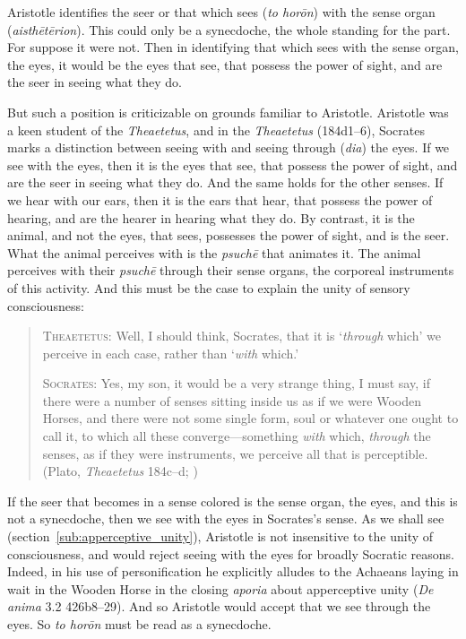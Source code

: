 Aristotle identifies the seer or that which sees (\emph{to horōn}) with the sense organ (\emph{aisthētērion}). This could only be a synecdoche, the whole standing for the part. For suppose it were not. Then in identifying that which sees with the sense organ, the eyes, it would be the eyes that see, that possess the power of sight, and are the seer in seeing what they do. 

But such a position is criticizable on grounds familiar to Aristotle. Aristotle was a keen student of the \emph{Theaetetus}, and in the \emph{Theaetetus} (184d1–6), Socrates marks a distinction between seeing with and seeing through (\emph{dia}) the eyes. If we see with the eyes, then it is the eyes that see, that possess the power of sight, and are the seer in seeing what they do. And the same holds for the other senses. If we hear with our ears, then it is the ears that hear, that possess the power of hearing, and are the hearer in hearing what they do. By contrast, it is the animal, and not the eyes, that sees, possesses the power of sight, and is the seer. What the animal perceives with is the \emph{psuchē} that animates it. The animal perceives with their \emph{psuchē} through their sense organs, the corporeal instruments of this activity. And this must be the case to explain the unity of sensory consciousness:
\begin{quotation}
	\textsc{Theaetetus}: Well, I should think, Socrates, that it is `\emph{through} which' we perceive in each case, rather than `\emph{with} which.'
	
	\textsc{Socrates}: Yes, my son, it would be a very strange thing, I must say, if there were a number of senses sitting inside us as if we were Wooden Horses, and there were not some single form, soul or whatever one ought to call it, to which all these converge—something \emph{with} which, \emph{through} the senses, as if they were instruments, we perceive all that is perceptible. (Plato, \emph{Theaetetus} 184c–d; \citealt[315]{Burnyeat:1990dp})
\end{quotation}

If the seer that becomes in a sense colored is the sense organ, the eyes, and this is not a synecdoche, then we see with the eyes in Socrates's sense. As we shall see (section~\ref{sub:apperceptive_unity}), Aristotle is not insensitive to the unity of consciousness, and would reject seeing with the eyes for broadly Socratic reasons. Indeed, in his use of personification he explicitly alludes to the Achaeans laying in wait in the Wooden Horse in the closing \emph{aporia} about apperceptive unity (\emph{De anima} 3.2 426b8–29). And so Aristotle would accept that we see through the eyes. So \emph{to horōn} must be read as a synecdoche.

